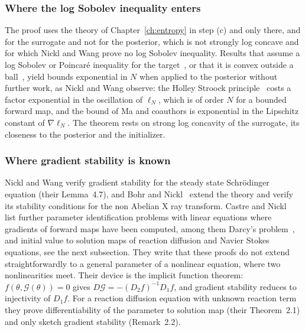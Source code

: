 \subsubsection{Where the log Sobolev inequality enters} The proof uses the theory of Chapter~\ref{ch:entropy} in step (c) and only there, and for the surrogate and not for the posterior, which is not strongly log concave and for which Nickl and Wang prove no log Sobolev inequality. Results that assume a log Sobolev or Poincar\'e inequality for the target~\cite{chewi2025}, or that it is convex outside a ball~\cite{ma2019}, yield bounds exponential in $N$ when applied to the posterior without further work, as Nickl and Wang observe: the Holley Stroock principle~\cite{holleystroock1987} costs a factor exponential in the oscillation of $\ell_N$, which is of order $N$ for a bounded forward map, and the bound of Ma and coauthors is exponential in the Lipschitz constant of $\nabla\ell_N$. The theorem rests on strong log concavity of the surrogate, its closeness to the posterior and the initializer.

\subsubsection{Where gradient stability is known} Nickl and Wang verify gradient stability for the steady state Schr\"odinger equation (their Lemma~4.7), and Bohr and Nickl~\cite{bohrnickl2024} extend the theory and verify its stability conditions for the non Abelian X ray transform. Castre and Nickl~\cite{castrenickl2026} list further parameter identification problems with linear equations where gradients of forward maps have been computed, among them Darcy's problem~\cite{nickl2023book,altmeyer2022}, and initial value to solution maps of reaction diffusion and Navier Stokes equations, see the next subsection. They write that these proofs do not extend straightforwardly to a general parameter of a nonlinear equation, where two nonlinearities meet. Their device is the implicit function theorem: $f(\theta,\mathcal{G}(\theta))=0$ gives $D\mathcal{G}=-(D_2f)^{-1}D_1f$, and gradient stability reduces to injectivity of $D_1f$. For a reaction diffusion equation with unknown reaction term they prove differentiability of the parameter to solution map (their Theorem~2.1) and only sketch gradient stability (Remark~2.2).

